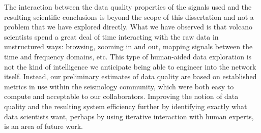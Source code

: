 \begin{itemize}
The interaction between the data quality properties of the signals used and
the resulting scientific conclusions is beyond the scope of this dissertation
and not a problem that we have explored directly. What we have observed is
that volcano scientists spend a great deal of time interacting with the raw
data in unstructured ways: browsing, zooming in and out, mapping signals
between the time and frequency domains, etc. This type of human-aided data
exploration is not the kind of intelligence we anticipate being able to
engineer into the network itself. Instead, our preliminary estimates of data
quality are based on established metrics in use within the seismology
community, which were both easy to compute and acceptable to our
collaborators. Improving the notion of data quality and the resulting system
efficiency further by identifying exactly what data scientists want, perhaps
by using iterative interaction with human experts, is an area of future work.

\end{itemize}
